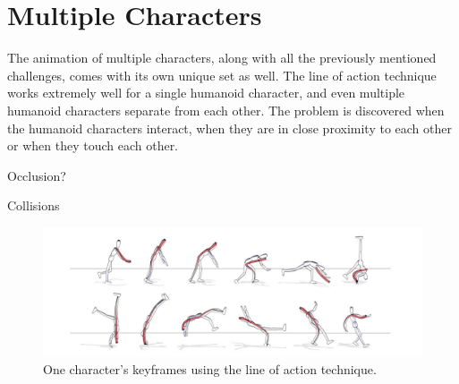 \section{Multiple Characters}
The animation of multiple characters, along with all the previously mentioned challenges, comes with its own unique set as well. The line of action technique works extremely well for a single humanoid character, and even multiple humanoid characters separate from each other. The problem is discovered when the humanoid characters interact, when they are in close proximity to each other or when they touch each other.


Occlusion?

Collisions

\begin{figure}
\includegraphics[scale=0.4]{img/baseline}
\caption{One character's keyframes using the line of action technique.}
\end{figure}